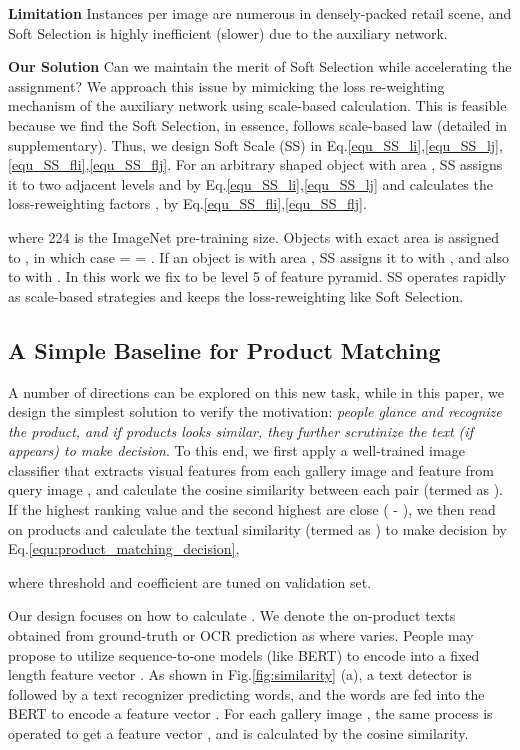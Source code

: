 \documentclass[runningheads]{llncs}
\begin{document}
\textbf{Limitation} Instances per image are numerous in densely-packed retail scene, and Soft Selection is highly inefficient (slower) due to the auxiliary network.

\textbf{Our Solution} Can we maintain the merit of Soft Selection while accelerating the assignment? We approach this issue by mimicking the loss re-weighting mechanism of the auxiliary network using scale-based calculation. This is feasible because we find the Soft Selection, in essence, follows scale-based law (detailed in supplementary). Thus, we design Soft Scale (SS) in Eq.\ref{equ_SS_li},\ref{equ_SS_lj},\ref{equ_SS_fli},\ref{equ_SS_flj}. For an arbitrary shaped object  with area , SS assigns it to two adjacent levels  and  by Eq.\ref{equ_SS_li},\ref{equ_SS_lj} and calculates the loss-reweighting factors ,  by Eq.\ref{equ_SS_fli},\ref{equ_SS_flj}.





where 224 is the ImageNet pre-training size.
Objects with exact area  is assigned to , in which case  =  = . If an object is with area , SS assigns it to  with , and also to  with . In this work we fix  to be level 5 of feature pyramid. SS operates rapidly as scale-based strategies and keeps the loss-reweighting like Soft Selection.

\subsection{A Simple Baseline for Product Matching}
\label{product_matching_baseline}
A number of directions can be explored on this new task, while in this paper, we design the simplest solution to verify the motivation: \textit{people glance and recognize the product, and if products looks similar, they further scrutinize the text (if appears) to make decision}. To this end, we first apply a well-trained image classifier that extracts visual features  from each gallery image  and feature  from query image , and calculate the cosine similarity between each pair  (termed as ). If the highest ranking value  and the second highest  are close ( -   ), we then read on products and calculate the textual similarity (termed as ) to make decision by Eq.\ref{equ:product_matching_decision},



\noindent where threshold  and coefficient  are tuned on validation set.

Our design focuses on how to calculate . We denote the on-product texts obtained from ground-truth or OCR prediction as  where  varies. People may propose to utilize sequence-to-one models (like BERT\cite{BERT}) to encode  into a fixed length feature vector . As shown in Fig.\ref{fig:similarity} (a), a text detector is followed by a text recognizer predicting  words, and the  words are fed into the BERT  to encode a feature vector . For each gallery image , the same process is operated to get a feature vector , and  is calculated by the cosine similarity.
\end{document}
